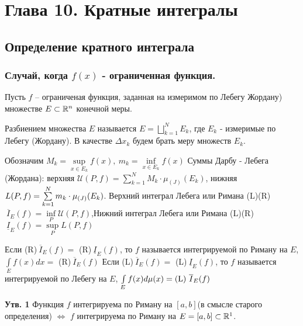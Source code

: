 \setcounter{section}{9}
\section{Глава 10. Кратные интегралы}
\subsection{Определение кратного интеграла}
\subsubsection{Случай, когда $f(x)$ - ограниченная функция.}
\begin{Def}
Пусть $f$ -- ограниченая функция, заданная на измеримом по Лебегу Жордану) множестве $E \subset \R^n$ конечной меры. 

$\textbf{Разбиением}$ множества $E$ называется $E=\bigsqcup\limits_{k=1}^N E_k$, где $E_k$ - измеримые по Лебегу (Жордану). \newline В качестве $\Delta x_k$ будем брать меру множеств $E_k$. 

Обозначим $M_k=\sup\limits_{x\in E_k} f(x),\  m_k=\inf\limits_{x\in E_k}f(x)$ \newline
Суммы Дарбу - Лебега (Жордана): верхняя $\mathcal{U}(P, f)=\sum\limits_{k=1}^N M_k \cdot \mu_{(J)}(E_k)$, нижняя $L(P, f)\?=\sum\limits_{k=1}^N m_k \cdot \mu_{(J)}(E_k)$.
\newline Верхний интеграл Лебега или Римана (L)(R)$\ \overline{I}_E(f)=\inf\limits_P \mathcal{U}(P, f)$,\newline Нижний интеграл Лебега или Римана (L)(R)$\ \underline{I}_E(f)=\sup\limits_P L(P, f)$
\end{Def}
\begin{Def}
Если (R)$\ \overline{I}_E(f)=$ (R)$\ \underline{I}_E(f)$, то $f$ называется интегрируемой по Риману на $E$, $\int\limits_E f(x)dx=$ (R)$\ \overline{I}_E(f)$ \newline
Если (L)$\ \overline{I}_E(f)=$ (L)$\ \underline{I}_E(f)$, то $f$ называется интегрируемой по Лебегу на $E$, $\int\limits_E f(x)d\mu (x)\?= \text{(L) }\overline{I}_E(f)$
\end{Def}
\textbf{Утв. 1} Функция $f$ интегрируема по Риману на $[a,b]$(в смысле старого определения) $\Leftrightarrow$ $f$ интегрируема по Риману на $E=[a,b] \subset \R^1$.
